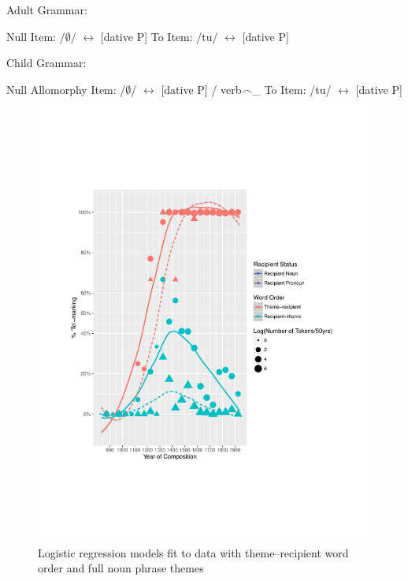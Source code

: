 	\begin{exe}
		\ex Adult Grammar:\label{ex:adult-grammar}
		\begin{xlist}
			\ex Null Item:  /$\emptyset$/ $\leftrightarrow$ [dative P]
			\ex To Item: /tu/ $\leftrightarrow$ [dative P]
		\end{xlist}
		\ex Child Grammar:\label{ex:child-grammar}
		\begin{xlist}
			\ex Null Allomorphy Item: /$\emptyset$/ $\leftrightarrow$ [dative P] / verb$\smallfrown$\_
			\ex To Item: /tu/ $\leftrightarrow$ [dative P]
		\end{xlist}
	\end{exe}

	\begin{figure}[ht!]
		\includegraphics[width=\linewidth]{../images/brit-tn}
		\caption{Logistic regression models fit to data with theme--recipient word order and full noun phrase themes}
		\label{fig:to-use}
	\end{figure}

